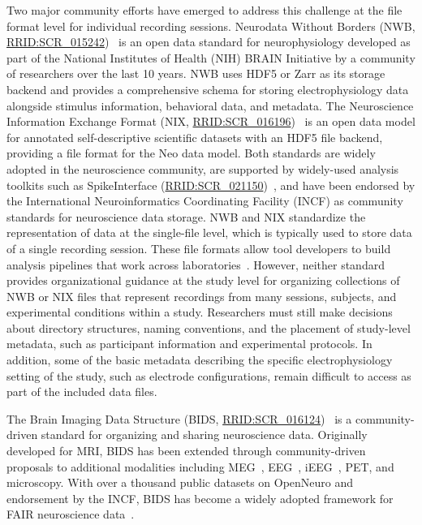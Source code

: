 \documentclass[fleqn,10pt]{article}
\newcommand{\rrid}[1]{\href{https://scicrunch.org/resolver/#1}{#1}}
\begin{document}
Two major community efforts have emerged to address this challenge at the file format level for individual recording sessions.
Neurodata Without Borders (NWB, \rrid{RRID:SCR\_015242})~\citep{rubel_neurodata_2022, teeters_neurodata_2015} is an open data standard for neurophysiology developed as part of the National Institutes of Health (NIH) BRAIN Initiative by a community of researchers over the last 10 years.
NWB uses HDF5 or Zarr as its storage backend and provides a comprehensive schema for storing electrophysiology data alongside stimulus information, behavioral data, and metadata.
The Neuroscience Information Exchange Format (NIX, \rrid{RRID:SCR\_016196})~\citep{adrian_file_2014} is an open data model for annotated self-descriptive scientific datasets with an HDF5 file backend, providing a file format for the Neo data model.
Both standards are widely adopted in the neuroscience community, are supported by widely-used analysis toolkits such as SpikeInterface (\rrid{RRID:SCR\_021150})~\citep{buccino_spikeinterface_2020}, and have been endorsed by the International Neuroinformatics Coordinating Facility (INCF) as community standards for neuroscience data storage.
NWB and NIX standardize the representation of data at the single-file level, which is typically used to store data of a single recording session. These file formats allow tool developers to build analysis pipelines that work across laboratories~\citep{denker_collaborative_2018, gutzen_2014, viejo_pynapple_2023, magland_neurosift_2024}.
However, neither standard provides organizational guidance at the study level for organizing collections of NWB or NIX files that represent recordings from many sessions, subjects, and experimental conditions within a study.
Researchers must still make decisions about directory structures, naming conventions, and the placement of study-level metadata, such as participant information and experimental protocols. In addition, some of the basic metadata describing the specific electrophysiology setting of the study, such as electrode configurations, remain difficult to access as part of the included data files.

The Brain Imaging Data Structure (BIDS, \rrid{RRID:SCR\_016124})~\citep{gorgolewski_brain_2016} is a community-driven standard for organizing and sharing neuroscience data. Originally developed for MRI, BIDS has been extended through community-driven proposals to additional modalities including MEG~\citep{niso_meg-bids_2018}, EEG~\citep{pernet_eeg-bids_2019}, iEEG~\citep{holdgraf_ieeg-bids_2019}, PET, and microscopy.
With over a thousand public datasets on OpenNeuro and endorsement by the INCF, BIDS has become a widely adopted framework for FAIR neuroscience data~\citep{wilkinson_fair_2016}.
\end{document}
